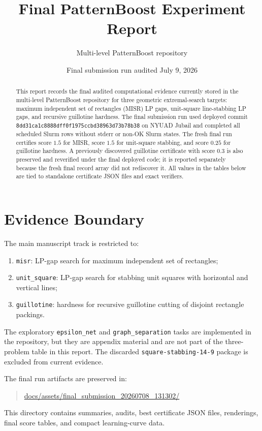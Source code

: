 \documentclass[11pt]{article}
\title{Final PatternBoost Experiment Report}
\author{Multi-level PatternBoost repository}
\date{Final submission run audited July 9, 2026}
\newcommand{\code}[1]{\texttt{#1}}
\newcommand{\artifact}[1]{{\footnotesize\url{#1}}}
\begin{document}
\maketitle

\begin{abstract}
This report records the final audited computational evidence currently stored
in the multi-level PatternBoost repository for three geometric extremal-search
targets: maximum independent set of rectangles (MISR) LP gaps, unit-square
line-stabbing LP gaps, and recursive guillotine hardness.  The final
submission run used deployed commit
\code{8dd31ca1c8888dff0f1975ccbd38963d73b78b38} on NYUAD Jubail and completed
all scheduled Slurm rows without stderr or non-OK Slurm states.  The fresh
final run certifies score $1.5$ for MISR, score $1.5$ for unit-square
stabbing, and score $0.25$ for guillotine hardness.  A previously discovered
guillotine certificate with score $0.3$ is also preserved and reverified under
the final deployed code; it is reported separately because the fresh final
record array did not rediscover it.  All values in the tables below are tied to
standalone certificate JSON files and exact verifiers.
\end{abstract}

\begingroup
\small
\setlength{\parskip}{0.15em}
\tableofcontents
\endgroup
\clearpage

\section{Evidence Boundary}

The main manuscript track is restricted to:
\begin{enumerate}
\item \code{misr}: LP-gap search for maximum independent set of rectangles;
\item \code{unit\_square}: LP-gap search for stabbing unit squares with
horizontal and vertical lines;
\item \code{guillotine}: hardness for recursive guillotine cutting of
disjoint rectangle packings.
\end{enumerate}

The exploratory \code{epsilon\_net} and \code{graph\_separation} tasks are
implemented in the repository, but they are appendix material and are not part
of the three-problem table in this report.  The discarded
\code{square-stabbing-14-9} package is excluded from current evidence.

The final run artifacts are preserved in:
\begin{quote}
\artifact{docs/assets/final_submission_20260708_131302/}
\end{quote}
This directory contains summaries, audits, best certificate JSON files,
renderings, final score tables, and compact learning-curve data.
\end{document}
